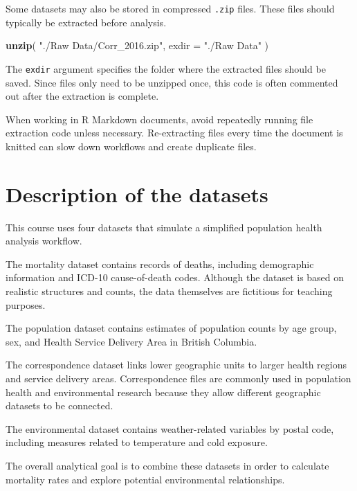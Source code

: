 \documentclass[
  11pt,
  oneside]{book}
\newenvironment{Shaded}{\begin{snugshade}}{\end{snugshade}}
\newcommand{\AttributeTok}[1]{\textcolor[rgb]{0.13,0.29,0.53}{#1}}
\newcommand{\FunctionTok}[1]{\textcolor[rgb]{0.13,0.29,0.53}{\textbf{#1}}}
\newcommand{\NormalTok}[1]{#1}
\newcommand{\StringTok}[1]{\textcolor[rgb]{0.31,0.60,0.02}{#1}}
\begin{document}
Some datasets may also be stored in compressed \texttt{.zip} files. These files should typically be extracted before analysis.

\begin{Shaded}
\begin{Highlighting}[]
\FunctionTok{unzip}\NormalTok{(}
  \StringTok{"./Raw Data/Corr\_2016.zip"}\NormalTok{,}
  \AttributeTok{exdir =} \StringTok{"./Raw Data"}
\NormalTok{)}
\end{Highlighting}
\end{Shaded}

The \texttt{exdir} argument specifies the folder where the extracted files should be saved. Since files only need to be unzipped once, this code is often commented out after the extraction is complete.

When working in R Markdown documents, avoid repeatedly running file extraction code unless necessary. Re-extracting files every time the document is knitted can slow down workflows and create duplicate files.

\section{Description of the datasets}\label{description-of-the-datasets}

This course uses four datasets that simulate a simplified population health analysis workflow.

The mortality dataset contains records of deaths, including demographic information and ICD-10 cause-of-death codes. Although the dataset is based on realistic structures and counts, the data themselves are fictitious for teaching purposes.

The population dataset contains estimates of population counts by age group, sex, and Health Service Delivery Area in British Columbia.

The correspondence dataset links lower geographic units to larger health regions and service delivery areas. Correspondence files are commonly used in population health and environmental research because they allow different geographic datasets to be connected.

The environmental dataset contains weather-related variables by postal code, including measures related to temperature and cold exposure.

The overall analytical goal is to combine these datasets in order to calculate mortality rates and explore potential environmental relationships.
\end{document}
